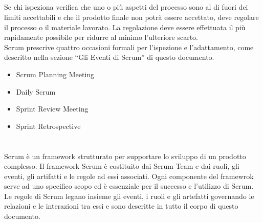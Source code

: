 \subsection*{\color{SteelBlue}{Adattamento}}
\label{sec:adaptation}
Se chi  ispeziona verifica che uno o pi\`u aspetti del processo sono al di fuori dei limiti accettabili  e che il prodotto 
finale non potr\`a essere accettato, deve regolare il processo o il materiale lavorato.  La regolazione  deve essere  effettuata 
il  pi\`u rapidamente possibile per ridurre al minimo l'ulteriore scarto. \newline
\\Scrum prescrive quattro occasioni formali per l'ispezione e l'adattamento, come descritto nella sezione ``Gli Eventi di Scrum'' 
di questo documento.

\begin{itemize}
     \item Scrum Planning Meeting
     \item Daily Scrum
     \item Sprint Review Meeting
     \item Sprint Retrospective
\end{itemize}


\section*{\color{Blue}{Scrum}}%
\label{sec:scrum}
Scrum \`e un framework strutturato per supportare lo sviluppo di un prodotto complesso. Il framework Scrum \`e costituito dai 
Scrum Team e dai ruoli, gli eventi, gli artifatti e le regole ad essi associati. Ogni componente del framewrok serve ad uno 
specifico scopo ed \`e essenziale per il successo e l'utilizzo di Scrum. \newline
\\ Le regole di Scrum legano insieme gli eventi, i ruoli e gli artefatti governando le relazioni e le interazioni tra essi e 
sono descritte in tutto il corpo di questo documento.
